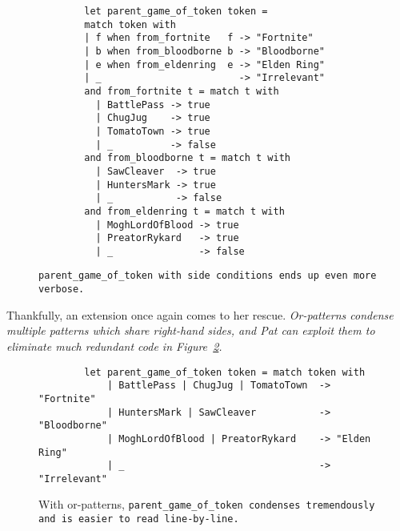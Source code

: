 \documentclass[manuscript,screen,review, 12pt]{acmart}
\begin{document}
        \begin{figure}
            \begin{center}
                \begin{verbatim}
        let parent_game_of_token token = 
        match token with 
        | f when from_fortnite   f -> "Fortnite"
        | b when from_bloodborne b -> "Bloodborne"
        | e when from_eldenring  e -> "Elden Ring"
        | _                        -> "Irrelevant"
        and from_fortnite t = match t with 
          | BattlePass -> true
          | ChugJug    -> true
          | TomatoTown -> true
          | _          -> false 
        and from_bloodborne t = match t with 
          | SawCleaver  -> true
          | HuntersMark -> true
          | _           -> false 
        and from_eldenring t = match t with 
          | MoghLordOfBlood -> true
          | PreatorRykard   -> true
          | _               -> false 
                \end{verbatim}
            \end{center}    

        \caption{\tt{parent\_game\_of\_token} with side conditions ends up 
        even more verbose.} 
        \label{fig:sideconditionpgot}
        \end{figure}

        Thankfully, an extension once again comes to her rescue.
        \it{Or-patterns} condense multiple patterns which share right-hand
        sides, and Pat can exploit them to eliminate much redundant code in
        Figure~\ref{fig:orpgot}.

    \begin{figure}
    \begin{center}
    \begin{verbatim}
        let parent_game_of_token token = match token with 
            | BattlePass | ChugJug | TomatoTown  -> "Fortnite"
            | HuntersMark | SawCleaver           -> "Bloodborne"
            | MoghLordOfBlood | PreatorRykard    -> "Elden Ring"
            | _                                  -> "Irrelevant"
    \end{verbatim}
    \end{center}    
    \caption{With or-patterns, \tt{parent\_game\_of\_token} condenses
    tremendously and is easier to read line-by-line.} 
    \label{fig:orpgot}
    \end{figure}
\end{document}
